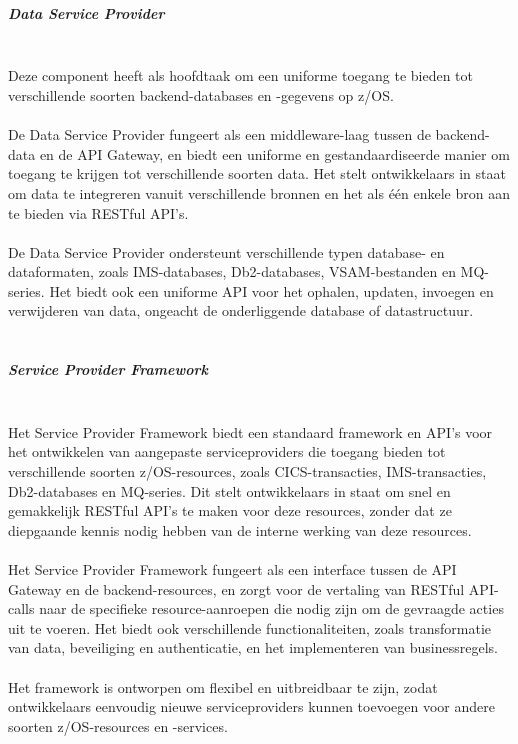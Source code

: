 \\ \\
\subparagraph{Data Service Provider} \mbox{} \\
Deze component heeft als hoofdtaak om een uniforme toegang te bieden tot verschillende soorten backend-databases en -gegevens op z/OS.
\\ \\
De Data Service Provider fungeert als een middleware-laag tussen de backend-data en de API Gateway, en biedt een uniforme en gestandaardiseerde manier om toegang te krijgen tot verschillende soorten data. Het stelt ontwikkelaars in staat om data te integreren vanuit verschillende bronnen en het als één enkele bron aan te bieden via RESTful API's. \autocite{IBM2023a}
\\ \\
De Data Service Provider ondersteunt verschillende typen database- en dataformaten, zoals IMS-databases, Db2-databases, VSAM-bestanden en MQ-series. Het biedt ook een uniforme API voor het ophalen, updaten, invoegen en verwijderen van data, ongeacht de onderliggende database of datastructuur. \autocite{IBM2023a}
\\ \\
\subparagraph{Service Provider Framework} \mbox{} \\
Het Service Provider Framework biedt een standaard framework en API's voor het ontwikkelen van aangepaste serviceproviders die toegang bieden tot verschillende soorten z/OS-resources, zoals CICS-transacties, IMS-transacties, Db2-databases en MQ-series. Dit stelt ontwikkelaars in staat om snel en gemakkelijk RESTful API's te maken voor deze resources, zonder dat ze diepgaande kennis nodig hebben van de interne werking van deze resources. \autocite{IBM2023a}
\\ \\
Het Service Provider Framework fungeert als een interface tussen de API Gateway en de backend-resources, en zorgt voor de vertaling van RESTful API-calls naar de specifieke resource-aanroepen die nodig zijn om de gevraagde acties uit te voeren. Het biedt ook verschillende functionaliteiten, zoals transformatie van data, beveiliging en authenticatie, en het implementeren van businessregels. \autocite{IBM2023a}
\\ \\
Het framework is ontworpen om flexibel en uitbreidbaar te zijn, zodat ontwikkelaars eenvoudig nieuwe serviceproviders kunnen toevoegen voor andere soorten z/OS-resources en -services. \autocite{IBM2023a}
\\ \\

